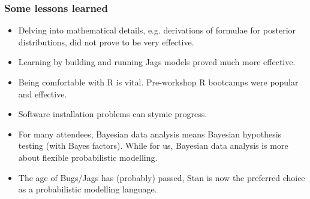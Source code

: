 \begin{frame}
	\frametitle{Some lessons learned}

	\begin{itemize}
		\item Delving into mathematical details, e.g. derivations of formulae for posterior distributions, did not prove to be very effective.
		\item Learning by building and running Jags models proved much more effective.
		\item Being comfortable with R is vital. Pre-workshop R bootcamps were popular and effective.
		\item Software installation problems can stymie progress.
		\item For many attendees, Bayesian data analysis means Bayesian hypothesis testing (with Bayes factors). While for us, Bayesian data analysis is more about flexible probabilistic modelling.
		\item The age of Bugs/Jags has (probably) passed, Stan is now the preferred choice as a probabilistic modelling language.

	\end{itemize}

\end{frame}

